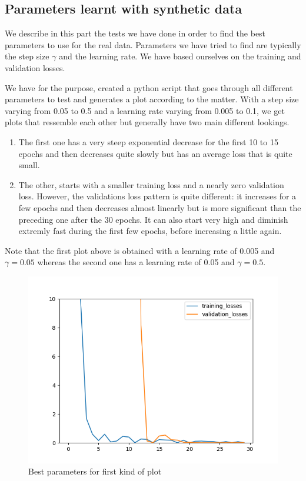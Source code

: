 \documentclass[10pt,conference]{IEEEtran}
\begin{document}
\subsection{Parameters learnt with synthetic data}
We describe in this part the tests we have done in order to find the best parameters to use for the real data. Parameters we have tried to find are typically the step size $\gamma$ and the learning rate. We have based ourselves on the training and validation losses.\par 
We have for the purpose, created a python script that goes through all different parameters to test and generates a plot according to the matter. With a step size varying from 0.05 to 0.5 and a learning rate varying from 0.005 to 0.1, we get plots that ressemble each other but generally have two main different lookings. 
\begin{enumerate}
  \item The first one has a very steep exponential decrease for the first 10 to 15 epochs and then decreases quite slowly but has an average loss that is quite small.
  \item The other, starts with a smaller training loss and a nearly zero validation loss. However, the validations loss pattern is quite different: it increases for a few epochs and then decreases almost linearly but is more significant than the preceding one after the 30 epochs. It can also start very high and diminish extremly fast during the first few epochs, before increasing a little again.
\end{enumerate}
Note that the first plot above is obtained with a learning rate of 0.005 and $\gamma=0.05$ whereas the second one has a learning rate of 0.05 and $\gamma=0.5$.
\begin{figure}
  \centering
  \includegraphics[scale=.4]{images/bestplot_1.png}
  \caption{Best parameters for first kind of plot}
\end{figure}
\end{document}

